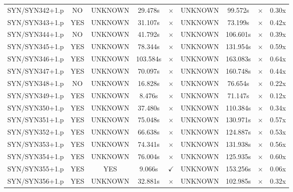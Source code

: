 \documentclass[a4paper,10pt]{article}
\begin{document}
\begin{longtable}{lcccccccc}
SYN/SYN342+1.p & NO & UNKNOWN & 29.478s & \cellcolor{mismatchcolor}$\times$ & UNKNOWN & 99.572s & \cellcolor{mismatchcolor}$\times$ & 0.30x \\
SYN/SYN343+1.p & YES & UNKNOWN & 31.107s & \cellcolor{mismatchcolor}$\times$ & UNKNOWN & 73.199s & \cellcolor{mismatchcolor}$\times$ & 0.42x \\
SYN/SYN344+1.p & NO & UNKNOWN & 41.792s & \cellcolor{mismatchcolor}$\times$ & UNKNOWN & 106.601s & \cellcolor{mismatchcolor}$\times$ & 0.39x \\
SYN/SYN345+1.p & YES & UNKNOWN & 78.344s & \cellcolor{mismatchcolor}$\times$ & UNKNOWN & 131.954s & \cellcolor{mismatchcolor}$\times$ & 0.59x \\
SYN/SYN346+1.p & YES & UNKNOWN & 103.584s & \cellcolor{mismatchcolor}$\times$ & UNKNOWN & 163.083s & \cellcolor{mismatchcolor}$\times$ & 0.64x \\
SYN/SYN347+1.p & YES & UNKNOWN & 70.097s & \cellcolor{mismatchcolor}$\times$ & UNKNOWN & 160.748s & \cellcolor{mismatchcolor}$\times$ & 0.44x \\
SYN/SYN348+1.p & NO & UNKNOWN & 16.828s & \cellcolor{mismatchcolor}$\times$ & UNKNOWN & 76.654s & \cellcolor{mismatchcolor}$\times$ & 0.22x \\
SYN/SYN349+1.p & YES & UNKNOWN & 8.476s & \cellcolor{mismatchcolor}$\times$ & UNKNOWN & 71.147s & \cellcolor{mismatchcolor}$\times$ & 0.12x \\
SYN/SYN350+1.p & YES & UNKNOWN & 37.480s & \cellcolor{mismatchcolor}$\times$ & UNKNOWN & 110.384s & \cellcolor{mismatchcolor}$\times$ & 0.34x \\
SYN/SYN351+1.p & YES & UNKNOWN & 75.048s & \cellcolor{mismatchcolor}$\times$ & UNKNOWN & 130.971s & \cellcolor{mismatchcolor}$\times$ & 0.57x \\
SYN/SYN352+1.p & YES & UNKNOWN & 66.638s & \cellcolor{mismatchcolor}$\times$ & UNKNOWN & 124.887s & \cellcolor{mismatchcolor}$\times$ & 0.53x \\
SYN/SYN353+1.p & YES & UNKNOWN & 74.341s & \cellcolor{mismatchcolor}$\times$ & UNKNOWN & 131.938s & \cellcolor{mismatchcolor}$\times$ & 0.56x \\
SYN/SYN354+1.p & YES & UNKNOWN & 76.004s & \cellcolor{mismatchcolor}$\times$ & UNKNOWN & 125.935s & \cellcolor{mismatchcolor}$\times$ & 0.60x \\
SYN/SYN355+1.p & YES & YES & 9.066s & \cellcolor{matchcolor}$\checkmark$ & UNKNOWN & 153.256s & \cellcolor{mismatchcolor}$\times$ & 0.06x \\
SYN/SYN356+1.p & YES & UNKNOWN & 32.881s & \cellcolor{mismatchcolor}$\times$ & UNKNOWN & 102.985s & \cellcolor{mismatchcolor}$\times$ & 0.32x \\

\end{longtable}
\end{document}
